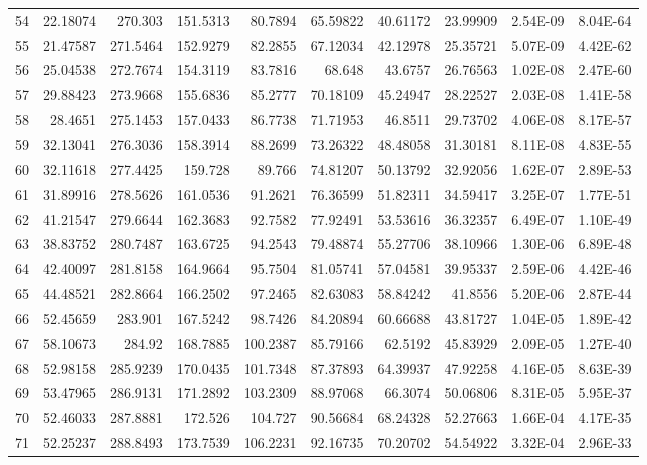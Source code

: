 \documentclass[a4paper]{article}
\begin{document}
{\begin{tabular}{|l|r|r|r|r|r|r|r|r|r|}
    {54} & 22.18074 & 270.303 & 151.5313 & 80.7894 & 65.59822 & 40.61172 & 23.99909 & 2.54E-09 & 8.04E-64 \\
    {55} & 21.47587 & 271.5464 & 152.9279 & 82.2855 & 67.12034 & 42.12978 & 25.35721 & 5.07E-09 & 4.42E-62 \\
    {56} & 25.04538 & 272.7674 & 154.3119 & 83.7816 & 68.648 & 43.6757 & 26.76563 & 1.02E-08 & 2.47E-60 \\
    {57} & 29.88423 & 273.9668 & 155.6836 & 85.2777 & 70.18109 & 45.24947 & 28.22527 & 2.03E-08 & 1.41E-58 \\
    {58} & 28.4651 & 275.1453 & 157.0433 & 86.7738 & 71.71953 & 46.8511 & 29.73702 & 4.06E-08 & 8.17E-57 \\
    {59} & 32.13041 & 276.3036 & 158.3914 & 88.2699 & 73.26322 & 48.48058 & 31.30181 & 8.11E-08 & 4.83E-55 \\
    {60} & 32.11618 & 277.4425 & 159.728 & 89.766 & 74.81207 & 50.13792 & 32.92056 & 1.62E-07 & 2.89E-53 \\
    {61} & 31.89916 & 278.5626 & 161.0536 & 91.2621 & 76.36599 & 51.82311 & 34.59417 & 3.25E-07 & 1.77E-51 \\
    {62} & 41.21547 & 279.6644 & 162.3683 & 92.7582 & 77.92491 & 53.53616 & 36.32357 & 6.49E-07 & 1.10E-49 \\
    {63} & 38.83752 & 280.7487 & 163.6725 & 94.2543 & 79.48874 & 55.27706 & 38.10966 & 1.30E-06 & 6.89E-48 \\
    {64} & 42.40097 & 281.8158 & 164.9664 & 95.7504 & 81.05741 & 57.04581 & 39.95337 & 2.59E-06 & 4.42E-46 \\
    {65} & 44.48521 & 282.8664 & 166.2502 & 97.2465 & 82.63083 & 58.84242 & 41.8556 & 5.20E-06 & 2.87E-44 \\
    {66} & 52.45659 & 283.901 & 167.5242 & 98.7426 & 84.20894 & 60.66688 & 43.81727 & 1.04E-05 & 1.89E-42 \\
    {67} & 58.10673 & 284.92 & 168.7885 & 100.2387 & 85.79166 & 62.5192 & 45.83929 & 2.09E-05 & 1.27E-40 \\
    {68} & 52.98158 & 285.9239 & 170.0435 & 101.7348 & 87.37893 & 64.39937 & 47.92258 & 4.16E-05 & 8.63E-39 \\
    {69} & 53.47965 & 286.9131 & 171.2892 & 103.2309 & 88.97068 & 66.3074 & 50.06806 & 8.31E-05 & 5.95E-37 \\
    {70} & 52.46033 & 287.8881 & 172.526 & 104.727 & 90.56684 & 68.24328 & 52.27663 & 1.66E-04 & 4.17E-35 \\
    {71} & 52.25237 & 288.8493 & 173.7539 & 106.2231 & 92.16735 & 70.20702 & 54.54922 & 3.32E-04 & 2.96E-33 \\

\end{tabular}}
\end{document}
